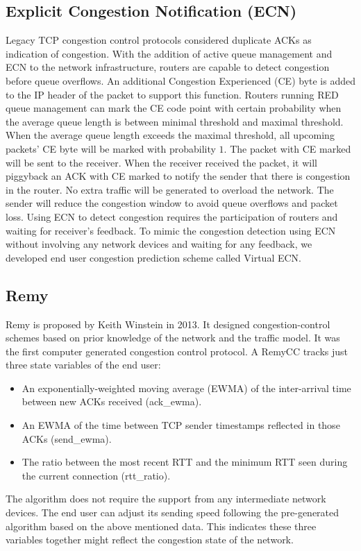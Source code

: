 \subsection{Explicit Congestion Notification (ECN)}
\par Legacy TCP congestion control protocols considered duplicate ACKs as indication of congestion. With the addition of active queue management and ECN \cite{ramakrishnan2001rfc} to the network infrastructure, routers are capable to detect congestion before queue overflows. An additional Congestion Experienced (CE) byte is added to the IP header of the packet to support this function. Routers running RED queue management can mark the CE code point with certain probability when the average queue length is between minimal threshold and maximal threshold. When the average queue length exceeds the maximal threshold, all upcoming packets' CE byte will be marked with probability $1$. The packet with CE marked will be sent to the receiver. When the receiver received the packet, it will piggyback an ACK with CE marked to notify the sender that there is congestion in the router. No extra traffic will be generated to overload the network. The sender will reduce the congestion window to avoid queue overflows and packet loss. Using ECN to detect congestion requires the participation of routers and waiting for receiver's feedback. To mimic the congestion detection using ECN without involving any network devices and waiting for any feedback, we developed end user congestion prediction scheme called Virtual ECN.
\subsection{Remy}
\par Remy \cite{winstein2013tcp} is proposed by Keith Winstein in 2013. It designed congestion-control schemes based on prior knowledge of the network and the traffic model. It was the first computer generated congestion control protocol. A RemyCC tracks just three state variables of the end user:
\begin{itemize}
\item An exponentially-weighted moving average (EWMA) of the inter-arrival time between new ACKs received (ack\_ewma).
\item An EWMA of the time between TCP sender timestamps reflected in those ACKs (send\_ewma).
\item The ratio between the most recent RTT and the minimum RTT seen during the current connection (rtt\_ratio).
\end{itemize}
The algorithm does not require the support from any intermediate network devices. The end user can adjust its sending speed following the pre-generated algorithm based on the above mentioned data. This indicates these three variables together might reflect the congestion state of the network. 


